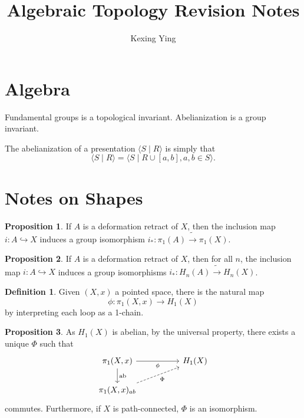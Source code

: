 \documentclass[]{article}
\title{Algebraic Topology Revision Notes}
\author{Kexing Ying}
\theoremstyle{definition}
\newtheorem*{definition}{Definition}
\newtheorem*{proposition}{Proposition}
\begin{document}
\maketitle

\section*{Algebra}

Fundamental groups is a topological invariant. Abelianization is a group invariant.

The abelianization of a presentation \(\langle S \mid R \rangle\) is simply that 
\[\langle S \mid R \rangle = \langle S \mid R \cup [a, b], a, b \in S \rangle.\]

\section*{Notes on Shapes}

\begin{proposition}
  If \(A\) is a deformation retract of \(X\), then the inclusion map \(i : A \hookrightarrow X\) 
  induces a group isomorphism \(i_* : \pi_1(A) \tilde \to \pi_1(X)\).
\end{proposition}

\begin{proposition}
  If \(A\) is a deformation retract of \(X\), then for all \(n\), the inclusion map \(i : A \hookrightarrow X\) 
  induces a group isomorphisms \(i_* : H_n(A) \tilde \to H_n(X)\).
\end{proposition}

\begin{definition}
  Given \((X, x)\) a pointed space, there is the natural map 
  \[\phi : \pi_1(X, x) \to H_1(X)\]
  by interpreting each loop as a 1-chain. 
\end{definition}

\begin{proposition}
  As \(H_1(X)\) is abelian, by the universal property, there exists a unique \(\Phi\) 
  such that 
  \[\begin{tikzcd}
    {\pi_1(X,x)} && {H_1(X)} \\
    {\pi_1(X,x)_{ab}}
    \arrow["{\text{ab}}", from=1-1, to=2-1]
    \arrow["\phi"', from=1-1, to=1-3]
    \arrow["\Phi"', dashed, from=2-1, to=1-3]
  \end{tikzcd}\]
  commutes. Furthermore, if \(X\) is path-connected, \(\Phi\) is an isomorphism.
\end{proposition}
\end{document}
